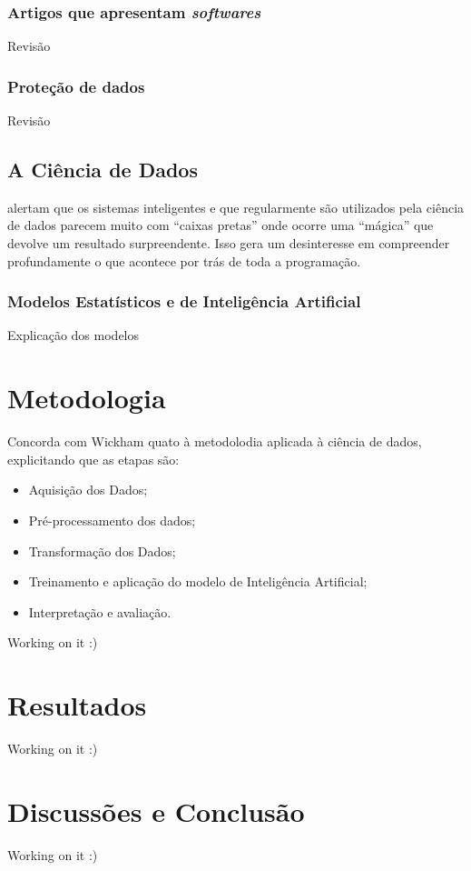 \documentclass[
]{book}
\providecommand{\tightlist}{%
  \setlength{\itemsep}{0pt}\setlength{\parskip}{0pt}}
\begin{document}
\hypertarget{artigos-que-apresentam-softwares}{%
\subsection{\texorpdfstring{Artigos que apresentam \emph{softwares}}{Artigos que apresentam softwares}}\label{artigos-que-apresentam-softwares}}

Revisão

\hypertarget{proteuxe7uxe3o-de-dados}{%
\subsection{Proteção de dados}\label{proteuxe7uxe3o-de-dados}}

Revisão

\hypertarget{a-ciuxeancia-de-dados}{%
\section{A Ciência de Dados}\label{a-ciuxeancia-de-dados}}

\citet{Waltl2018} alertam que os sistemas inteligentes e que regularmente são utilizados pela ciência de dados parecem muito com ``caixas pretas'' onde ocorre uma ``mágica'' que devolve um resultado surpreendente. Isso gera um desinteresse em compreender profundamente o que acontece por trás de toda a programação.

\hypertarget{modelos-estatuxedsticos-e-de-inteliguxeancia-artificial}{%
\subsection{Modelos Estatísticos e de Inteligência Artificial}\label{modelos-estatuxedsticos-e-de-inteliguxeancia-artificial}}

Explicação dos modelos

\hypertarget{metodologia}{%
\chapter{Metodologia}\label{metodologia}}

\citet{Waltl2018} Concorda com Wickham quato à metodolodia aplicada à ciência de dados, explicitando que as etapas são:

\begin{itemize}
\tightlist
\item
  Aquisição dos Dados;
\item
  Pré-processamento dos dados;
\item
  Transformação dos Dados;
\item
  Treinamento e aplicação do modelo de Inteligência Artificial;
\item
  Interpretação e avaliação.
\end{itemize}

Working on it :)

\hypertarget{resultados}{%
\chapter{Resultados}\label{resultados}}

Working on it :)

\hypertarget{discussuxf5es-e-conclusuxe3o}{%
\chapter{Discussões e Conclusão}\label{discussuxf5es-e-conclusuxe3o}}

Working on it :)

  
\end{document}
